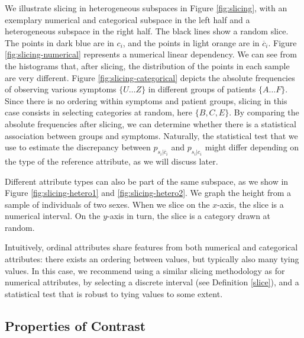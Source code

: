 We illustrate slicing in heterogeneous subspaces in Figure \ref{fig:slicing}, with an exemplary numerical and categorical subspace in the left half and a heterogeneous subspace in the right half. 
The black lines show a random slice. The points in dark blue are in $c_i$, and the points in light orange are in $\overline{c}_i$. 
Figure \ref{fig:slicing-numerical} represents a numerical linear dependency. We can see from the histograms that, after slicing, the distribution of the points in each sample are very different. 
Figure \ref{fig:slicing-categorical} depicts the absolute frequencies of observing various symptoms $\{U \dots Z\}$ in different groups of patients $\{A \dots F\}$. 
Since there is no ordering within symptoms and patient groups, slicing in this case consists in selecting categories at random, here $\{B, C, E\}$. By comparing the absolute frequencies after slicing, we can determine whether there is a statistical association between groups and symptoms. 
Naturally, the statistical test that we use to estimate the discrepancy between $p_{s_i | {\overline{c}_i}}$ and $p_{s_i | {c_i}}$ might differ depending on the type of the reference attribute, as we will discuss later.  %

Different attribute types can also be part of the same subspace, as we show in Figure \ref{fig:slicing-hetero1} and \ref{fig:slicing-hetero2}. We graph the height from a sample of individuals of two sexes. 
When we slice on the $x$-axis, the slice is a numerical interval. 
On the $y$-axis in turn, the slice is a category drawn at random. 

Intuitively, ordinal attributes share features from both numerical and categorical attributes: there exists an ordering between values, but typically also many tying values. In this case, we recommend using a similar slicing methodology as for numerical attributes, by selecting a discrete interval (see Definition \ref{slice}), and a statistical test that is robust to tying values to some extent. 

\subsection{Properties of Contrast}
\label{contrastproperties}

